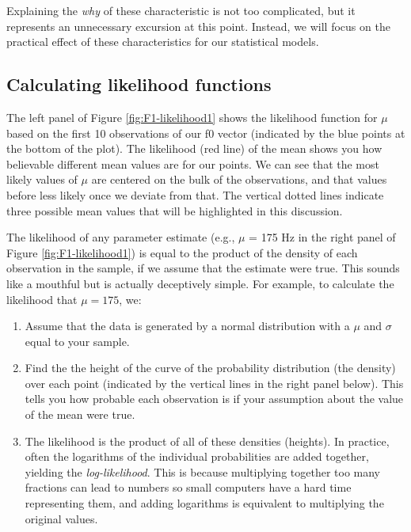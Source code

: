 \documentclass[
]{book}
\begin{document}
Explaining the \emph{why} of these characteristic is not too complicated, but it represents an unnecessary excursion at this point. Instead, we will focus on the practical effect of these characteristics for our statistical models.

\hypertarget{calculating-likelihood-functions}{%
\subsection{Calculating likelihood functions}\label{calculating-likelihood-functions}}

The left panel of Figure \ref{fig:F1-likelihood1} shows the likelihood function for \(\mu\) based on the first 10 observations of our f0 vector (indicated by the blue points at the bottom of the plot). The likelihood (red line) of the mean shows you how believable different mean values are for our points. We can see that the most likely values of \(\mu\) are centered on the bulk of the observations, and that values before less likely once we deviate from that. The vertical dotted lines indicate three possible mean values that will be highlighted in this discussion.

The likelihood of any parameter estimate (e.g., \(\mu\) = 175 Hz in the right panel of Figure \ref{fig:F1-likelihood1}) is equal to the product of the density of each observation in the sample, if we assume that the estimate were true. This sounds like a mouthful but is actually deceptively simple. For example, to calculate the likelihood that \(\mu=175\), we:

\begin{enumerate}
\def\labelenumi{\arabic{enumi})}
\item
  Assume that the data is generated by a normal distribution with a \(\mu\) and \(\sigma\) equal to your sample.
\item
  Find the the height of the curve of the probability distribution (the density) over each point (indicated by the vertical lines in the right panel below). This tells you how probable each observation is if your assumption about the value of the mean were true.
\item
  The likelihood is the product of all of these densities (heights). In practice, often the logarithms of the individual probabilities are added together, yielding the \emph{log-likelihood}. This is because multiplying together too many fractions can lead to numbers so small computers have a hard time representing them, and adding logarithms is equivalent to multiplying the original values.
\end{enumerate}
\end{document}
